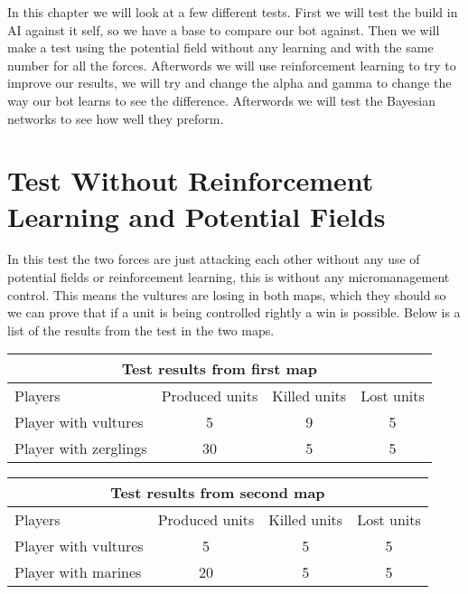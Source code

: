 
In this chapter we will look at a few different tests.
First we will test the build in AI against it self, so we have a base to compare our bot against. Then we will make a test using the potential field without any learning and with the same number for all the forces. Afterwords we will use reinforcement learning to try to improve our results, we will try and change the alpha and gamma to change the way our bot learns to see the difference. Afterwords we will test the Bayesian networks to see how well they preform.

\section{Test Without Reinforcement Learning and Potential Fields} %
In this test the two forces are just attacking each other without any use of potential fields or reinforcement learning, this is without any micromanagement control. This means the vultures are losing in both maps, which they should so we can prove that if a unit is being controlled rightly a win is possible. Below is a list of the results from the test in the two maps.\\

\begin{centering}
\begin{table}
 \begin{tabular}{|l|c|c|c|}
	\multicolumn{4}{c}{Test results from first map} \\
	\hline
		Players & Produced units & Killed units & Lost units\\
	\hline
	\hline
		Player with vultures & 5 & 9 & 5 \\
	\hline
		Player with zerglings & 30 & 5 & 5\\
	\hline

\end{tabular}
\end{table}
\end{centering}
\newpage

\begin{centering}
\begin{table}
 \begin{tabular}{|l|c|c|c|}
	\multicolumn{4}{c}{Test results from second map} \\
	\hline
	Players & Produced units & Killed units & Lost units\\
	\hline
		Player with vultures & 5 & 5 & 5\\
	\hline
		Player with marines & 20 & 5 & 5\\
	\hline

\end{tabular}
\end{table}
\end{centering}

